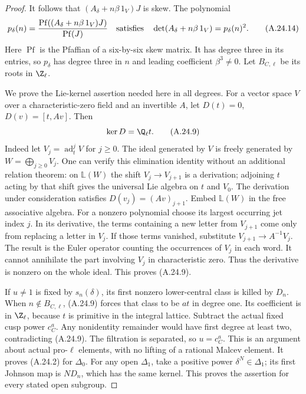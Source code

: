 \begin{proof}
It follows that $(A_\delta+n\beta\,1_V)J$ is skew.
The polynomial
\[
 p_\delta(n)=
 \frac{\operatorname{Pf}((A_\delta+n\beta\,1_V)J)}
      {\operatorname{Pf}(J)}
 \quad\hbox{satisfies}\quad
 \det(A_\delta+n\beta\,1_V)=p_\delta(n)^2.
                                                        \tag{A.24.14}
\]
Here $\operatorname{Pf}$ is the Pfaffian of a six-by-six
skew matrix. It has degree three in its entries, so
$p_\delta$ has degree three in $n$ and leading
coefficient $\beta^3\ne0$.
Let $B_{C,\ell}$ be its roots in $\Z_\ell$.

We prove the Lie-kernel assertion needed here in all
degrees. For a vector space $V$ over a characteristic-zero
field and an invertible $A$, let
$D(t)=0$, $D(v)=[t,Av]$. Then
\[
                    \ker D=\Q_\ell t.                  \tag{A.24.9}
\]
Indeed let $V_j=\operatorname{ad}_t^jV$ for $j\ge0$.
The ideal generated by $V$ is freely generated by
$W=\bigoplus_{j\ge0}V_j$. One can verify this elimination
identity without an additional relation theorem:
on $\mathbb L(W)$ the shift $V_j\to V_{j+1}$ is a
derivation; adjoining $t$ acting by that shift gives the
universal Lie algebra on $t$ and $V_0$.
The derivation under consideration satisfies
$D(v_j)=(Av)_{j+1}$.
Embed $\mathbb L(W)$ in the free associative algebra.
For a nonzero polynomial choose its largest occurring jet
index $j$. In its derivative, the terms containing a new
letter from $V_{j+1}$ come only from replacing a letter in
$V_j$. If those terms vanished, substitute
$V_{j+1}\to A^{-1}V_j$. The result is the Euler operator
counting the occurrences of $V_j$ in each word.
It cannot annihilate the part involving $V_j$ in
characteristic zero. Thus the derivative is nonzero on the
whole ideal. This proves (A.24.9).

If $u\ne1$ is fixed by $s_n(\delta)$, its first nonzero
lower-central class is killed by $D_n$. When
$n\notin B_{C,\ell}$, (A.24.9) forces that class to be
$a t$ in degree one. Its coefficient is in $\Z_\ell$,
because $t$ is primitive in the integral lattice.
Subtract the actual fixed cusp power $c_C^a$.
Any nonidentity remainder would have first degree at least
two, contradicting (A.24.9). The filtration is separated,
so $u=c_C^a$. This is an argument about actual pro-$\ell$
elements, with no lifting of a rational Malcev element.
It proves (A.24.2) for $\Delta_0$.
For any open $\Delta_1$, take a positive power
$\delta^N\in\Delta_1$; its first Johnson map is $ND_n$,
which has the same kernel. This proves the assertion for
every stated open subgroup.


\end{proof}
